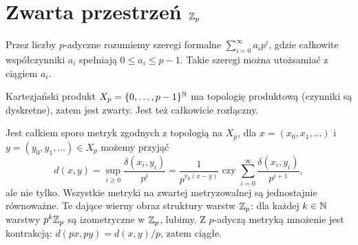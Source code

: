 \section{Zwarta przestrzeń $\mathbb Z_p$}
Przez liczby $p$-adyczne rozumiemy szeregi formalne $\sum_{i=0}^\infty a_i p^i$, gdzie całkowite współczynniki $a_i$ spełniają $0\le a_i \le p-1$.
Takie szeregi można utożsamiać z ciągiem $a_i$.

Kartezjański produkt $X_p = \{0, \dots, p-1\}^\mathbb N$ ma topologię produktową (czynniki są dyskretne), zatem jest zwarty.
Jest też całkowicie rozłączny.

Jest całkiem sporo metryk zgodnych z topologią na $X_p$, dla $x = (x_0, x_1, \dots)$ i $y = (y_0, y_1, \dots) \in X_p$ możemy przyjąć
\[
	d(x,y) = \sup_{i \ge 0} \frac{\delta(x_i, y_i)}{p^i} = \frac{1}{p^{v_p(x - y)}} \textrm{ czy } \sum_{i = 0}^\infty \frac{\delta(x_i,y_i)}{p^{i+1}},
\]
ale nie tylko.
Wszystkie metryki na zwartej metryzowalnej są jednostajnie równoważne.
Te dające wierny obraz struktury warstw $\mathbb Z_p$: dla każdej $k \in \mathbb N$ warstwy $p^k \mathbb Z_p$ są izometryczne w $\mathbb Z_p$, lubimy.
Z $p$-adyczą metryką mnożenie jest kontrakcją: $d(px, py) = d(x,y) / p$, zatem ciągłe.
